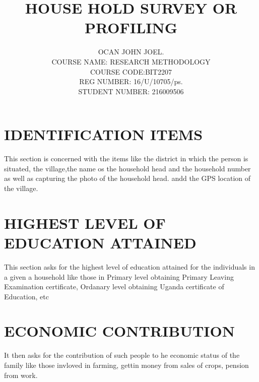\documentclass[12pt,a4paper]{article}
\begin{document}
\title{HOUSE HOLD SURVEY OR PROFILING}
\author{OCAN JOHN JOEL.\\
COURSE NAME: RESEARCH METHODOLOGY\\
   COURSE CODE:BIT2207\\
    REG NUMBER: 16/U/10705/ps.\\
      STUDENT NUMBER: 216009506\\}
\maketitle   
\section{IDENTIFICATION ITEMS}
    
	This section is concerned with the  items like  the district in which the person is situated, the village,the name os the household head and the household number as well as capturing the photo of the household head. andd the GPS location of the village.\\

\section{HIGHEST LEVEL OF EDUCATION ATTAINED}
This section asks for the highest level of education attained for the individuals in a given a household like those in Primary level obtaining Primary Leaving Examination certificate, Ordanary level obtaining Uganda certificate of Education, etc\\

\section{ECONOMIC CONTRIBUTION}
    It then asks for the contribution of such people to he economic status of the family like those invloved in farming, gettin money from sales of crops, pension from work.\\
    
   
    
    
    
    
    
    
\end{document}
